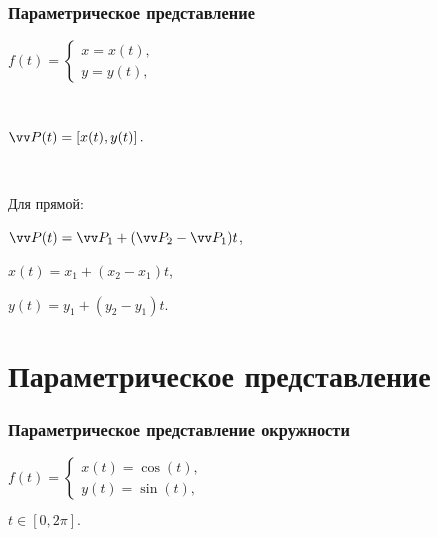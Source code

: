 \documentclass[10pt]{beamer}
\begin{document}
\begin{frame}\frametitle{Параметрическое представление}
	
	{
		
		
	}{
		$
		f(t)=
		\begin{cases}
		x=x(t),\\
		y=y(t),	
		\end{cases}
		$
		
		~
		
		$
		\vv P(t)=\left[x(t),y(t)\right].
		$
		
		~
		
		
		Для прямой:
		
		$\vv P(t) = \vv P_1+(\vv P_2-\vv P_1)t$,
		
		$x(t)=x_1+(x_2-x_1)t$,
		
		$y(t)=y_1+(y_2-y_1)t$.
	}
	
\end{frame}

\section{Параметрическое представление}
\frame{\sectionpage}

\begin{frame}\frametitle{Параметрическое представление окружности}
	{
		
		$
		f(t)=
		\begin{cases}
			x(t)=\cos(t),\\
			y(t)=\sin(t),
		\end{cases}
		$
		
		$
		t \in [0, 2\pi].
		$
		
	}{
	}
		
	
\end{frame}
\end{document}
